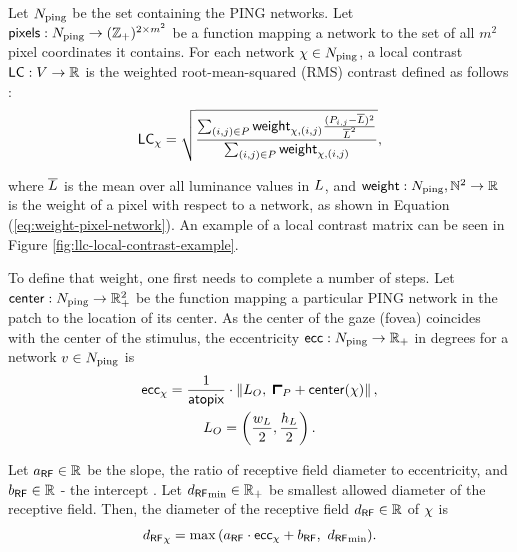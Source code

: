 Let $N_{\mathrm{ping}}$ be the set containing the PING networks. Let $\mathsf{pixels}: N_{\mathrm{ping}} \to (\mathbb{Z}_+)^{2 \times m^2}$ be a function mapping a network to the set of all $m^2$ pixel coordinates it contains.
For each network $\chi \in N_{\mathrm{ping}}$, a local contrast $\mathsf{LC}: V \to \mathbb{R}$ is the weighted root-mean-squared (RMS) contrast defined as follows \cite{Frazor2006}:
\begin{equation}
    \mathsf{LC}_\chi = \sqrt{
        \frac{
            \sum_{(i, j) \in P} \mathsf{weight}_{\chi, (i, j)} \frac{(P_{i, j} - \overline{L})^2}{\overline{L}^2}
        }{
            \sum_{(i, j) \in P} \mathsf{weight}_{\chi, (i, j)}
        }
    },
\end{equation}

where $\overline{L}$ is the mean over all luminance values in $L$, and $\mathsf{weight}: N_{\mathrm{ping}}, \mathbb{N}^2 \to \mathbb{R}$ is the weight of a pixel with respect to a network, as shown in Equation (\ref{eq:weight-pixel-network}). An example of a local contrast matrix can be seen in Figure \ref{fig:llc-local-contrast-example}.

To define that weight, one first needs to complete a number of steps.
Let $\mathsf{center} : N_{\mathrm{ping}} \to \mathbb{R}_+^2$ be the function mapping a particular PING network in the patch to the location of its center. As the center of the gaze (fovea) coincides with the center of the stimulus, the eccentricity $\mathsf{ecc}: N_{\mathrm{ping}} \to \mathbb{R}_+$ in degrees for a network $v \in N_{\mathrm{ping}}$ is
\begin{equation}
\begin{gathered}
    \ecc_{\pingnet} = \frac{1}{\atopix} \cdot \left\| \stimcenter, \ \patchstart + \centr(\pingnet) \right\|, \\
    \stimcenter = \left( \frac{\fullwidth}{2}, \frac{\fullheight}{2}   \right).
\end{gathered}
\end{equation}

Let $a_\mathsf{RF} \in \mathbb{R}$ be the slope, the ratio of receptive field diameter to eccentricity, and $b_\mathsf{RF} \in \mathbb{R}$ - the intercept \cite{Freeman2011, MaryamPLACEHOLDER}.
Let ${d_\mathsf{RF}}_{\min} \in \mathbb{R}_+$ be smallest allowed diameter of the receptive field.
Then, the diameter of the receptive field ${d_\mathsf{RF}} \in \mathbb{R}$ of $\chi$ is 
\begin{equation}
    {d_\mathsf{RF}}_\chi = \max{( a_\mathsf{RF}\cdot \mathsf{ecc}_\chi+ b_\mathsf{RF}, \ {d_\mathsf{RF}}_{\min} )}.
\end{equation}

